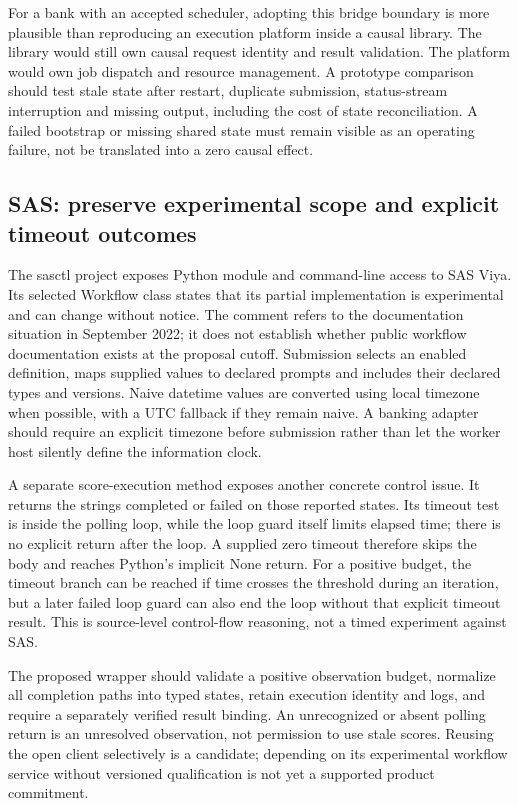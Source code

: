 For a bank with an accepted scheduler, adopting this bridge boundary is more
plausible than reproducing an execution platform inside a causal library.
The library would still own causal request identity and result validation.
The platform would own job dispatch and resource management. A prototype
comparison should test stale state after restart, duplicate submission,
status-stream interruption and missing output, including the cost of state
reconciliation. A failed bootstrap or missing shared state must remain
visible as an operating failure, not be translated into a zero causal effect.

\subsection{SAS: preserve experimental scope and explicit timeout outcomes}
\label{exec23:clients-sas}

The sasctl project exposes Python module and command-line access to SAS
Viya. Its selected Workflow class states that its partial implementation is
experimental and can change without notice. The comment refers to the
documentation situation in September 2022; it does not establish whether
public workflow documentation exists at the proposal cutoff. Submission
selects an enabled definition, maps supplied values to declared prompts
and includes their declared types and versions. Naive datetime values are
converted using local timezone when possible, with a UTC fallback if they
remain naive. A banking adapter should require an explicit timezone before
submission rather than let the worker host silently define the information
clock.
\citep{exec23_workflow_sasctl}

A separate score-execution method exposes another concrete control issue.
It returns the strings completed or failed on those reported states. Its
timeout test is inside the polling loop, while the loop guard itself limits
elapsed time; there is no explicit return after the loop. A supplied zero
timeout therefore skips the body and reaches Python's implicit None return.
For a positive budget, the timeout branch can be reached if time crosses
the threshold during an iteration, but a later failed loop guard can also
end the loop without that explicit timeout result. This is source-level
control-flow reasoning, not a timed experiment against SAS.
\citep{exec23_workflow_sasctl,exec23_workflow_client_reference}

The proposed wrapper should validate a positive observation budget, normalize
all completion paths into typed states, retain execution identity and logs,
and require a separately verified result binding. An unrecognized or absent
polling return is an unresolved observation, not permission to use stale
scores. Reusing the open client selectively is a candidate; depending on its
experimental workflow service without versioned qualification is not yet a
supported product commitment.

